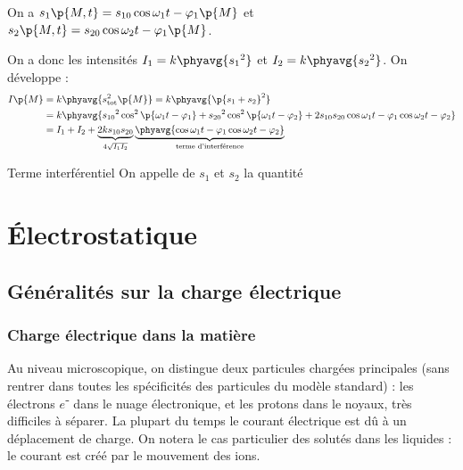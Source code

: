     On a $s_1\p{M, t} = s_{10}\cos{\omega_1 t - \varphi_1\p{M}}$ et $s_2\p{M, t} = s_{20}\cos{\omega_2 t - \varphi_1\p{M}}$.
    
    On a donc les intensités $I_1 = k\phyavg{{s_1}^2}$ et $I_2 = k\phyavg{{s_2}^2}$. On développe :
    \begin{align*}
        I\p{M} &= k\phyavg{{s_\text{tot}^2\p{M}}} = k\phyavg{\p{s_1 + s_2}^2}\\
        &= k\phyavg{{s_{10}}^2\cos^2\p{\omega_1 t - \varphi_1} + {s_{20}}^2\cos^2\p{\omega_1 t - \varphi_2} + 2s_{10}s_{20}\cos{\omega_1 t - \varphi_1}\cos{\omega_2 t - \varphi_2}}\\
        &= I_1 + I_2 + \underbrace{2ks_{10}s_{20}}_{4\sqrt{I_1I_2}}\underbrace{\phyavg{\cos{\omega_1 t - \varphi_1}\cos{\omega_2 t - \varphi_2}}}_{\text{terme d'interférence}}
    \end{align*}
    
    \begin{definition}{Terme interférentiel}{}
        On appelle  de $s_1$ et $s_2$ la quantité 
    \end{definition}
    
    \newpage
    
    
    \chapter{Électrostatique}
    
    \chaptertoc{}
    
    \section{Généralités sur la  charge électrique}
    
    \subsection{Charge électrique dans la matière}
    
    Au niveau microscopique, on distingue deux particules chargées principales (sans rentrer dans toutes les spécificités des particules du modèle standard) :
    les électrons $e⁻$ dans le nuage électronique, et les protons dans le noyaux, très difficiles à séparer. La plupart du temps le courant électrique est dû à un déplacement de charge. On notera le cas particulier des solutés dans les liquides : le courant est créé par le mouvement des ions.
    
